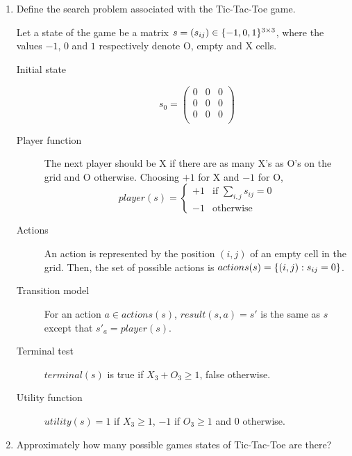 \documentclass[11pt, a4paper]{article}
\begin{document}
\begin{enumerate}
    \item Define the search problem associated with the Tic-Tac-Toe game.
    
    \begin{solution}
        Let a state of the game be a matrix $s = (s_{ij}) \in \{-1, 0, 1\}^{3 \times 3}$, where the values $-1$, $0$ and $1$ respectively denote O, empty and X cells.
        \begin{description}
            \item[Initial state]
            \begin{equation*}
                s_0 = \begin{pmatrix} 0 & 0 & 0 \\ 0 & 0 & 0 \\ 0 & 0 & 0 \\ \end{pmatrix}
            \end{equation*}
            \item[Player function] The next player should be X if there are as many X's as O's on the grid and O otherwise. Choosing $+1$ for X and $-1$ for O,
            \begin{equation*}
                player(s) = \begin{cases}
                    +1 & \text{if } \sum_{i, j} s_{ij} = 0 \\
                    -1 & \text{otherwise}
                \end{cases}
            \end{equation*}
            \item[Actions] An action is represented by the position $(i, j)$ of an empty cell in the grid. Then, the set of possible actions is $actions(s) = \{(i, j): s_{ij} = 0\}$.
            \item[Transition model] For an action $a \in actions(s)$, $result(s, a) = s'$ is the same as $s$ except that $s'_a = player(s)$.
            \item[Terminal test] $terminal(s)$ is true if $X_3 + O_3 \geq 1$, false otherwise.
            \item[Utility function] $utility(s) = 1$ if $X_3 \geq 1$, $-1$ if $O_3 \geq 1$ and $0$ otherwise.
        \end{description}
    \end{solution}
    
    \item Approximately how many possible games states of Tic-Tac-Toe are there?
    

\end{enumerate}
\end{document}
